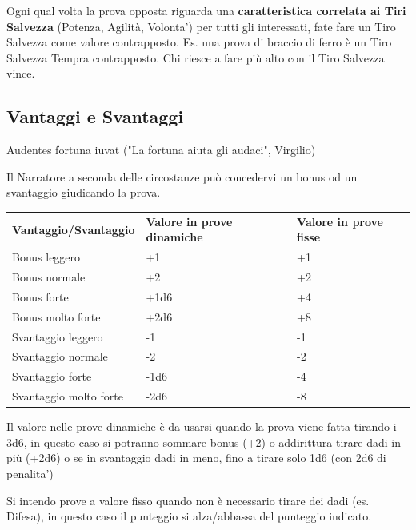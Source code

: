 \documentclass[a4paper,11pt,twoside,openany]{book}
\begin{document}
\begin{note}
Ogni qual volta la prova opposta riguarda una \textbf{caratteristica correlata ai Tiri Salvezza} (Potenza, Agilità, Volonta') per tutti gli interessati, fate fare un Tiro Salvezza come valore contrapposto. Es. una prova di braccio di ferro è un Tiro Salvezza Tempra contrapposto. Chi riesce a fare più alto con il Tiro Salvezza vince.
\end{note}


\bigskip

\subsection{Vantaggi e Svantaggi}

\begin{tcolorbox}[enhanced,arc=5pt,boxrule=0.3pt]{ Audentes fortuna iuvat ("La fortuna aiuta gli audaci", Virgilio) }\end{tcolorbox}

Il Narratore a seconda delle circostanze può concedervi un bonus od un svantaggio giudicando la prova.

\bigskip

\begin{tabular}{lll}
	\toprule
	\textbf{Vantaggio/Svantaggio} & \textbf{Valore in prove dinamiche} & \textbf{Valore in prove fisse}\\
	Bonus leggero & +1 & +1\\
	Bonus normale & +2 & +2\\
	Bonus forte   & +1d6               & +4\\
	Bonus molto forte             & +2d6               & +8\\
	Svantaggio leggero            & -1 & -1\\
	Svantaggio normale            & -2 & -2\\
	Svantaggio forte              & -1d6               & -4\\
	Svantaggio molto forte        & -2d6               & -8\\
\end{tabular}

\bigskip

Il valore nelle prove dinamiche è da usarsi quando la prova viene fatta tirando i 3d6, in questo caso si potranno sommare bonus (+2) o addirittura tirare dadi in più (+2d6) o se in svantaggio dadi in meno, fino a tirare solo 1d6 (con 2d6 di penalita')

Si intendo prove a valore fisso quando non è necessario tirare dei dadi (es. Difesa), in questo caso il punteggio si alza/abbassa del punteggio indicato.
\end{document}
